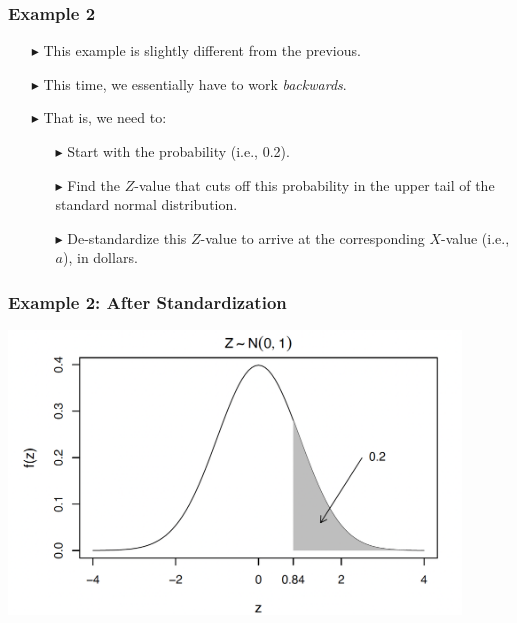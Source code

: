 \documentclass[12pt]{beamer}
\begin{document}
\begin{frame}
	\frametitle{Example 2}
	
	\begin{itemize}
		\item[\color{blue}$\blacktriangleright$] This example is slightly different from the previous.
		\item[\color{blue}$\blacktriangleright$] This time, we essentially have to work \textit{backwards}.
		\item[\color{blue}$\blacktriangleright$] That is, we need to:
		\begin{itemize}
			\item[\color{blue}$\blacktriangleright$] Start with the probability (i.e., 0.2).
			\item[\color{blue}$\blacktriangleright$] Find the $Z$-value that cuts off this probability in the 
			upper tail of the standard normal distribution.
			\item[\color{blue}$\blacktriangleright$] De-standardize this $Z$-value to arrive at the 
			corresponding $X$-value (i.e., $a$), in dollars.
		\end{itemize}
	\end{itemize}
	
\end{frame}
	\begin{frame}
	\frametitle{Example 2: After Standardization}
	\centering
	\includegraphics[width=12cm]{example22.png}
\end{frame}
\end{document}

